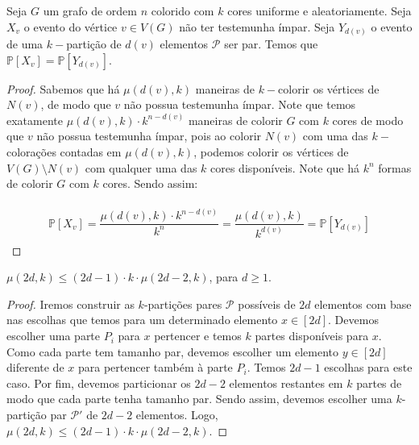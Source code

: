 \documentclass[12pt]{article}
\begin{document}
{ 
 \begin{lema}  
 	\label{lema2} 
 	Seja $G$ um grafo de ordem $n$ colorido com $k$ cores uniforme e aleatoriamente. Seja $X_{v}$ o evento do vértice $v \in V(G)$ não ter testemunha ímpar. Seja $Y_{d(v)}$ o evento de uma $k-$partição de $d(v)$ elementos $\mathcal{P}$ ser par.  Temos que $\mathds{P}[X_{v}] = \mathds{P}[Y_{d(v)}]$.
 \end{lema}
 
 \begin{proof}
 	Sabemos que há $\mu(d(v), k)$ maneiras de $k-$colorir os vértices de $N(v)$, de modo que $v$ não possua testemunha ímpar. Note que temos exatamente $\mu(d(v), k) {\cdot} k^{n - d(v)}$ maneiras de colorir $G$ com $k$ cores de modo que $v$ não possua testemunha ímpar, pois ao colorir $N(v)$ com uma das $k-$colorações contadas em $\mu(d(v), k)$, podemos colorir os vértices de $V(G)\setminus N(v)$ com qualquer uma das $k$ cores disponíveis. Note que há $k^n$ formas de colorir $G$ com $k$ cores. Sendo assim: 
 	
 	\begin{align}
 		\begin{split}
 			\mathds{P}[X_v] = \dfrac{\mu(d(v), k) {\cdot} k^{n - d(v)}}{k^n} = \dfrac{\mu(d(v), k)}{k^{d(v)}} = \mathds{P}[Y_{d(v)}]
 		\end{split} 
 	\end{align}
 	
 \end{proof}
 
 
 \begin{lema}  
 	\label{lema3} 
 	$\mu(2d, k) \leq (2d - 1) \cdot k \cdot \mu(2d - 2, k)$, para $d \geq 1$.
 \end{lema}
 
 \begin{proof} Iremos construir as $k$-partições pares $\mathcal{P}$ possíveis de $2d$ elementos com base nas escolhas que temos para um determinado elemento $x \in [2d]$. Devemos escolher uma parte $P_i$ para $x$ pertencer e temos $k$ partes disponíveis para $x$. Como cada parte tem tamanho par, devemos escolher um elemento $y \in [2d]$ diferente de $x$ para pertencer também à parte $P_i$. Temos $2d - 1$ escolhas para este caso. Por fim, devemos particionar os $2d - 2$ elementos restantes em $k$ partes de modo que cada parte tenha tamanho par. Sendo assim, devemos escolher uma $k$-partição par $\mathcal{P'}$ de $2d - 2$ elementos. Logo, $\mu(2d, k) \leq (2d - 1) \cdot k \cdot \mu(2d - 2, k)$. 
 	
 \end{proof} \newl
 
}
\end{document}
